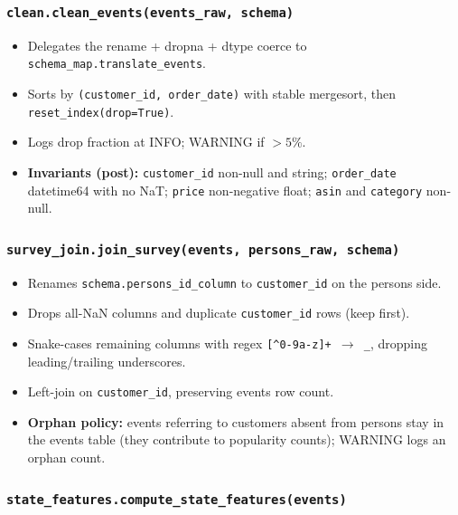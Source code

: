 \documentclass[11pt,a4paper]{article}
\begin{document}
\subsubsection*{\texttt{clean.clean\_events(events\_raw, schema)}}

\begin{itemize}
\item[$\triangleright$] Delegates the rename + dropna + dtype coerce to
\texttt{schema\_map.translate\_events}.
\item[$\triangleright$] Sorts by \texttt{(customer\_id, order\_date)} with stable
mergesort, then \texttt{reset\_index(drop=True)}.
\item[$\triangleright$] Logs drop fraction at INFO; WARNING if $>5\%$.
\item[$\triangleright$] \textbf{Invariants (post):} \texttt{customer\_id} non-null and
string; \texttt{order\_date} datetime64 with no NaT; \texttt{price}
non-negative float; \texttt{asin} and \texttt{category} non-null.
\end{itemize}

\subsubsection*{\texttt{survey\_join.join\_survey(events, persons\_raw, schema)}}

\begin{itemize}
\item[$\triangleright$] Renames \texttt{schema.persons\_id\_column} to
\texttt{customer\_id} on the persons side.
\item[$\triangleright$] Drops all-NaN columns and duplicate \texttt{customer\_id}
rows (keep first).
\item[$\triangleright$] Snake-cases remaining columns with regex
\texttt{[\^{}0-9a-z]+ $\to$ \_}, dropping leading/trailing
underscores.
\item[$\triangleright$] Left-join on \texttt{customer\_id}, preserving events row
count.
\item[$\triangleright$] \textbf{Orphan policy:} events referring to customers
absent from persons stay in the events table (they contribute to
popularity counts); WARNING logs an orphan count.
\end{itemize}

\subsubsection*{\texttt{state\_features.compute\_state\_features(events)}}
\end{document}

